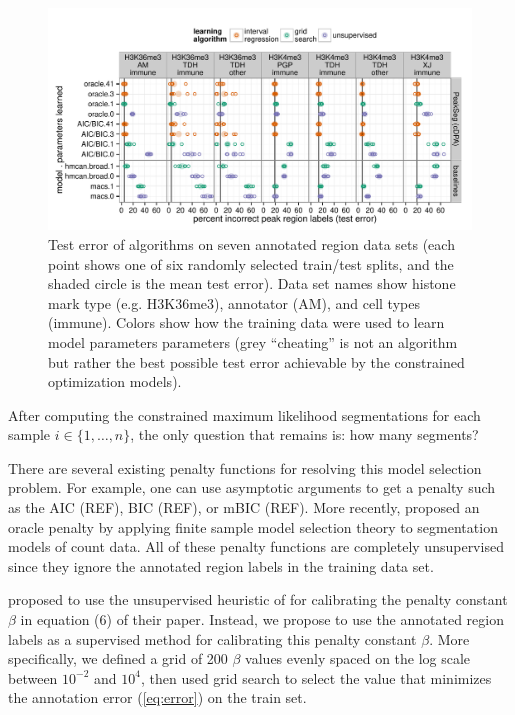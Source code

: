 \documentclass{article}
\begin{document}
\begin{figure}[b!]
  \centering
  \includegraphics[width=\textwidth]{figure-dp-peaks-regression-dots}
  \vskip -0.5cm
  \caption{Test error of algorithms on seven annotated region data
    sets (each point shows one of six randomly selected train/test
    splits, and the shaded circle is the mean test error). Data set
    names show histone mark type (e.g. H3K36me3), annotator (AM), and
    cell types (immune). Colors show how the training data were used
    to learn model parameters parameters (grey ``cheating'' is not an
    algorithm but rather the best possible test error achievable by
    the constrained optimization models).}
  \label{fig:test-error}
\end{figure}

After computing the constrained maximum likelihood segmentations for
each sample $i\in\{1,\dots, n\}$, the only question that remains is:
how many segments?

There are several existing penalty functions for resolving this model
selection problem. For example, one can use asymptotic arguments to
get a penalty such as the AIC (REF), BIC (REF), or mBIC (REF). More
recently, \citet{cleynen2013segmentation} proposed an oracle penalty
by applying finite sample model selection theory to segmentation
models of count data. All of these penalty functions are completely
unsupervised since they ignore the annotated region labels in the
training data set.

\citet{cleynen2013segmentation} proposed to use the 
un\-supervised heuristic of \citet{Lav05} for calibrating the penalty
constant $\beta$ in equation (6) of their paper. Instead, we propose to
use the annotated region labels as a super\-vised method for calibrating
this penalty constant $\beta$. More specifically, we defined a grid of
200 $\beta$ values evenly spaced on the log scale between $10^{-2}$
and $10^4$, then used grid search to select the value that minimizes
the annotation error (\ref{eq:error}) on the train set.
\end{document}
